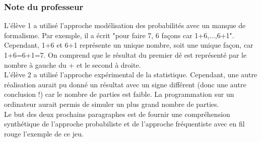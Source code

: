 \documentclass{book}
\begin{document}
\subsubsection*{Note du professeur} L'élève 1 a utilisé l'approche modélisation des probabilités avec un manque de formalisme. Par exemple, il a écrit "pour faire 7, 6 façons car 1+6,...,6+1". Cependant, 1+6 et 6+1 représente un unique nombre, soit une unique façon, car 1+6=6+1=7. On comprend que le résultat du premier dé est représenté par le nombre à gauche du + et le second à droite.\\
L'élève 2 a utilisé l'approche expérimental de la statistique. Cependant, une autre réalisation aurait pu donné un résultat avec un signe différent (donc une autre conclusion !) car le nombre de parties est faible. La programmation sur un ordinateur aurait permis de simuler un plus grand nombre de parties.\\
Le but des deux prochains paragraphes  est de fournir une compréhension synthétique de l'approche probabiliste et de l'approche fréquentiste avec en fil rouge l'exemple de ce jeu.  
\end{document}
